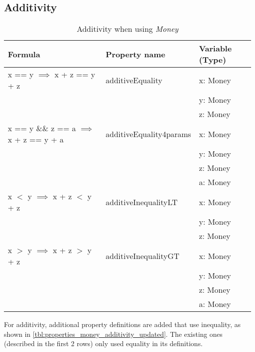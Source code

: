 \subsection*{Additivity}
\label{ssct:properties_additivity_updated}
\FloatBarrier
\begin{table}[!ht]
\centering
\begin{tabular}{lll}
\hline
                        \textbf{Formula}                             & \textbf{Property name}  & \textbf{Variable (Type)} \\ \hline
\rowcolor[HTML]{EFEFEF} x == y $\implies$ x + z == y + z             & additiveEquality        & x: Money                 \\
\rowcolor[HTML]{EFEFEF}                                              &                         & y: Money                 \\
\rowcolor[HTML]{EFEFEF}                                              &                         & z: Money                 \\
                        x == y \&\& z == a $\implies$ x + z == y + a & additiveEquality4params & x: Money                 \\
                                                                     &                         & y: Money                 \\
                                                                     &                         & z: Money                 \\
                                                                     &                         & a: Money                 \\
\rowcolor[HTML]{EFEFEF} x $<$ y $\implies$ x + z $<$ y + z           & additiveInequalityLT    & x: Money                 \\
\rowcolor[HTML]{EFEFEF}                                              &                         & y: Money                 \\
\rowcolor[HTML]{EFEFEF}                                              &                         & z: Money                 \\
                        x $>$ y $\implies$ x + z $>$ y + z           & additiveInequalityGT    & x: Money                 \\
                                                                     &                         & y: Money                 \\
                                                                     &                         & z: Money                 \\
                                                                     &                         & a: Money                 \\ \hline
\end{tabular}
\caption{Additivity when using \textit{Money}}
\label{tbl:properties_money_additivity_updated}
\end{table}
\FloatBarrier
For additivity, additional property definitions are added that use inequality, 
as shown in \autoref{tbl:properties_money_additivity_updated}. The existing ones
(described in the first 2 rows) only used equality in its definitions.

